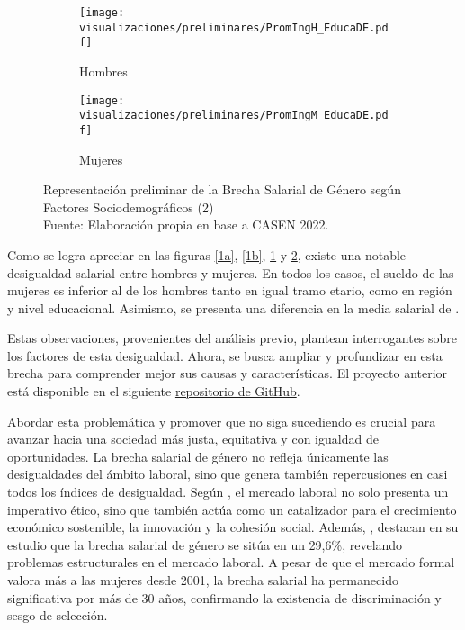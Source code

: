 \FloatBarrier

\begin{figure}[htbp]
	\centering
	\begin{subfigure}[b]{0.49\textwidth}
		\centering
		\texttt{[image: visualizaciones/preliminares/PromIngH\_EducaDE.pdf]}
		\caption{Hombres}
		\label{2a} 
	\end{subfigure}
	\hfill
	\begin{subfigure}[b]{0.49\textwidth}
		\centering
		\texttt{[image: visualizaciones/preliminares/PromIngM\_EducaDE.pdf]}
		\caption{Mujeres}
		\label{2b}
	\end{subfigure}
	\caption{Representación preliminar de la Brecha Salarial de Género según Factores Sociodemográficos (2)\\Fuente: Elaboración propia en base a CASEN 2022. \citep{Proyecto1}}
	\label{02fig}
\end{figure}

\FloatBarrier

Como se logra apreciar en las figuras \ref{1a}, \ref{1b}, \ref{2a} y \ref{2b}, existe una notable desigualdad salarial entre hombres y mujeres. En todos los casos, el sueldo de las mujeres es inferior al de los hombres tanto en igual tramo etario, como en región y nivel educacional. Asimismo, se presenta una diferencia en la media salarial de . 

Estas observaciones, provenientes del análisis previo, plantean interrogantes sobre los factores de esta desigualdad. Ahora, se busca ampliar y profundizar en esta brecha para comprender mejor sus causas y características. El proyecto anterior está disponible en el siguiente \href{https://github.com/ElK1000o/Taller-Ciencia-de-Datos-I/tree/main/Proyecto}{repositorio de GitHub}.

Abordar esta problemática y promover que no siga sucediendo es crucial para avanzar hacia una sociedad más justa, equitativa y con igualdad de oportunidades. La brecha salarial de género no refleja únicamente las desigualdades del ámbito laboral, sino que genera también repercusiones en casi todos los índices de desigualdad. Según \citet{Castro-Romero2024}, el mercado laboral no solo presenta un imperativo ético, sino que también actúa como un catalizador para el crecimiento económico sostenible, la innovación y la cohesión social. Además, \citet{Cuellar2022}, destacan en su estudio que la brecha salarial de género se sitúa en un 29,6\%, revelando problemas estructurales en el mercado laboral. A pesar de que el mercado formal valora más a las mujeres desde 2001, la brecha salarial ha permanecido significativa por más de 30 años, confirmando la existencia de discriminación y sesgo de selección.

